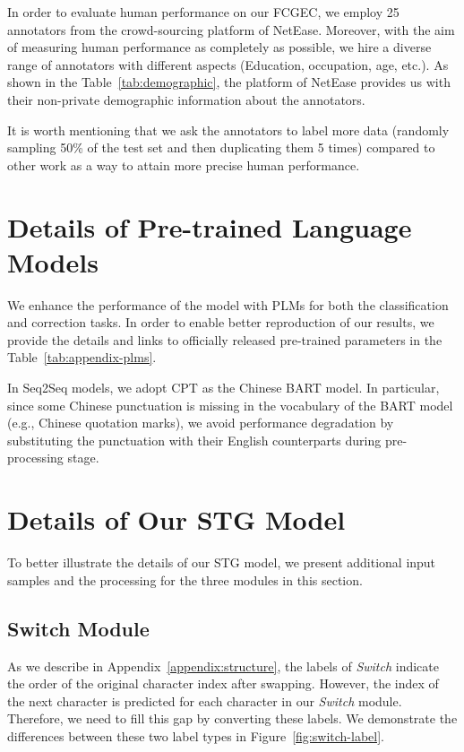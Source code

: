 \documentclass[11pt]{article}
\begin{document}
In order to evaluate human performance on our FCGEC, we employ 25 annotators from the crowd-sourcing platform of NetEase. Moreover, with the aim of measuring human performance as completely as possible, we hire a diverse range of annotators with different aspects (Education, occupation, age, etc.). As shown in the Table~\ref{tab:demographic}, the platform of NetEase provides us with their non-private demographic information about the annotators.


It is worth mentioning that we ask the annotators to label more data (randomly sampling 50\% of the test set and then duplicating them 5 times) compared to other work as a way to attain more precise human performance.


\section{Details of Pre-trained Language Models}
\label{appendix:appendix-plm}


We enhance the performance of the model with PLMs for both the classification and correction tasks. In order to enable better reproduction of our results, we provide the details and links to officially released pre-trained parameters in the Table~\ref{tab:appendix-plms}.

In Seq2Seq models, we adopt CPT as the Chinese BART model. In particular, since some Chinese punctuation is missing in the vocabulary of the BART model (e.g., Chinese quotation marks), we avoid performance degradation by substituting the punctuation with their English counterparts during pre-processing stage.

\section{Details of Our STG Model}
\label{appendix:stg-appendix}

To better illustrate the details of our STG model, we present additional input samples and the processing for the three modules in this section.

\subsection{Switch Module}
\label{appendix:switch}
As we describe in Appendix~\ref{appendix:structure}, the labels of \emph{Switch} indicate the order of the original character index after swapping. However, the index of the next character is predicted for each character in our \emph{Switch} module. Therefore, we need to fill this gap by converting these labels. We demonstrate the differences between these two label types in Figure~\ref{fig:switch-label}.
\end{document}
